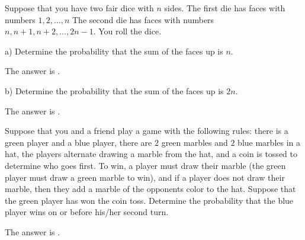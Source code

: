 \documentclass{ximera}
\begin{document}
\begin{question}
Suppose that you have two fair dice with $n$ sides.  The first die has faces with numbers $1, 2, ..., n$  The second die has faces with numbers $n, n+1, n+2, ..., 2n-1$.  You roll the dice.

a)  Determine the probability that the sum of the faces up is $n$.
     \begin{solution}
           The answer is .
     \end{solution}

b)  Determine the probability that the sum of the faces up is $2n$.
     \begin{solution}
           The answer is .
     \end{solution}
\end{question}

\begin{question}
Suppose that you and a friend play a game with the following rules:  there is a green player and a blue player,  there are $2$ green marbles and $2$ blue marbles in a hat, the players alternate drawing a marble from the hat, and a coin is tossed to determine who goes first.  To win, a player must draw their marble (the green player must draw a green marble to win), and if a player does not draw their marble, then they add a marble of the opponents color to the hat.  Suppose that the green player has won the coin toss.  Determine the probability that the blue player wins on or before his/her second turn.
     \begin{solution}
           The answer is .
     \end{solution}
\end{question}
\end{document}
